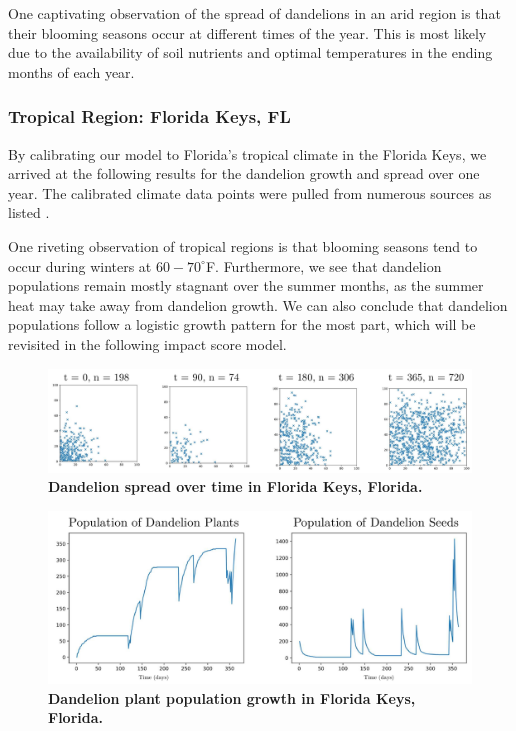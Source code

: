 One captivating observation of the spread of dandelions in an arid region is that their blooming seasons occur at different times of the year. This is most likely due to the availability of soil nutrients and optimal temperatures in the ending months of each year.

\subsubsection{Tropical Region: Florida Keys, FL}

By calibrating our model to Florida's tropical climate in the Florida Keys, we arrived at the following results for the dandelion growth and spread over one year. The calibrated climate data points were pulled from numerous sources as listed \cite{obreza_importance_2003, noauthor_average_nodate-1, pritchett_nitrogen_1959}.

One riveting observation of tropical regions is that blooming seasons tend to occur during winters at \(60-70^\circ\)F. Furthermore, we see that dandelion populations remain mostly stagnant over the summer months, as the summer heat may take away from dandelion growth. We can also conclude that dandelion populations follow a logistic growth pattern for the most part, which will be revisited in the following impact score model.

\begin{figure}[h!]
\centering
    \includegraphics[scale=0.6]{figures/floridadistributions.pdf}
    \captionsetup{width=0.9\textwidth}
    \caption{\textbf{Dandelion spread over time in Florida Keys, Florida.} }
    \label{fig:floridaspread}
\end{figure}

\begin{figure}[h!]
\centering
    \includegraphics[scale=0.5]{figures/floridapopulation.pdf}
    \captionsetup{width=0.9\textwidth}
    \caption{\textbf{Dandelion plant population growth in Florida Keys, Florida.}}
    \label{fig:floridapopulation}
\end{figure}

